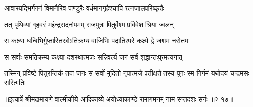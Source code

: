 \twolineshloka
{आवारयद्भिर्गगनं विमानैरिव पाण्डुरैः}
{वर्धमानगृहैश्चापि रत्नजालपरिष्कृतैः} %

\twolineshloka
{तत् पृथिव्यां गृहवरं महेन्द्रसदनोपमम्}
{राजपुत्रः पितुर्वेश्म प्रविवेश श्रिया ज्वलन्} %

\twolineshloka
{स कक्ष्या धन्विभिर्गुप्तास्तिस्रोऽतिक्रम्य वाजिभिः}
{पदातिरपरे कक्ष्ये द्वे जगाम नरोत्तमः} %

\twolineshloka
{स सर्वाः समतिक्रम्य कक्ष्या दशरथात्मजः}
{सन्निवर्त्य जनं सर्वं शुद्धान्तःपुरमत्यगात्} %

\twolineshloka
{तस्मिन् प्रविष्टे पितुरन्तिकं तदा जनः स सर्वो मुदितो नृपात्मजे}
{प्रतीक्षते तस्य पुनः स्म निर्गमं यथोदयं चन्द्रमसः सरित्पतिः} %


॥इत्यार्षे श्रीमद्रामायणे वाल्मीकीये आदिकाव्ये अयोध्याकाण्डे रामागमनम् नाम सप्तदशः सर्गः ॥२-१७॥
